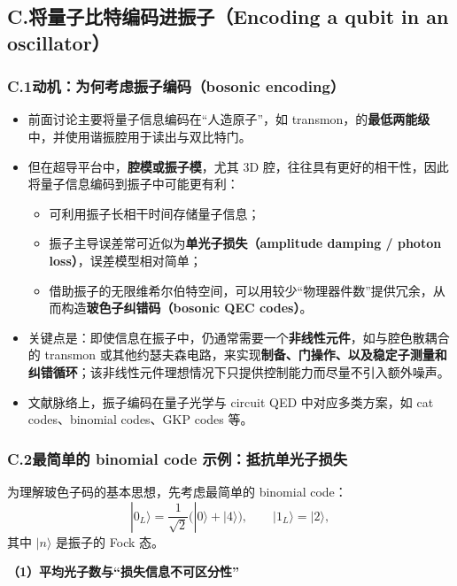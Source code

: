 \documentclass[12pt,a4paper,oneside]{ctexbook}
\begin{document}
\subsection{C.\quad 将量子比特编码进振子（Encoding a qubit in an oscillator）}

\subsubsection{C.1\quad 动机：为何考虑振子编码（bosonic encoding）}

\begin{itemize}
  \item 前面讨论主要将量子信息编码在“人造原子”，如 transmon，的\textbf{最低两能级}中，并使用谐振腔用于读出与双比特门。
  \item 但在超导平台中，\textbf{腔模或振子模}，尤其 3D 腔，往往具有更好的相干性，因此将量子信息编码到振子中可能更有利：
  \begin{itemize}
    \item 可利用振子长相干时间存储量子信息；
    \item 振子主导误差常可近似为\textbf{单光子损失（amplitude damping / photon loss）}，误差模型相对简单；
    \item 借助振子的无限维希尔伯特空间，可以用较少“物理器件数”提供冗余，从而构造\textbf{玻色子纠错码（bosonic QEC codes）}。
  \end{itemize}
  \item 关键点是：即使信息在振子中，仍通常需要一个\textbf{非线性元件}，如与腔色散耦合的 transmon 或其他约瑟夫森电路，来实现\textbf{制备、门操作、以及稳定子测量和纠错循环}；该非线性元件理想情况下只提供控制能力而尽量不引入额外噪声。
  \item 文献脉络上，振子编码在量子光学与 circuit QED 中对应多类方案，如 cat codes、binomial codes、GKP codes 等。
\end{itemize}

\subsubsection{C.2\quad 最简单的 binomial code 示例：抵抗单光子损失}

为理解玻色子码的基本思想，先考虑最简单的 binomial code：
\begin{equation}
  |0_L\rangle=\frac{1}{\sqrt{2}}\big(|0\rangle+|4\rangle\big),
  \qquad
  |1_L\rangle=|2\rangle,
  \tag{154}
\end{equation}
其中 $|n\rangle$ 是振子的 Fock 态。

\noindent\textbf{（1）平均光子数与“损失信息不可区分性”}
\end{document}
